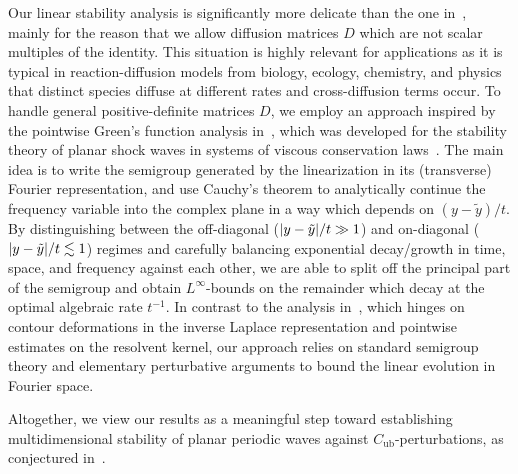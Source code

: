 \documentclass[12pt,oneside,a4paper,reqno]{amsart}
\numberwithin{equation}{section}
\theoremstyle{definition}
\theoremstyle{remark}
\newcommand{\Cub}{{C_{\mathrm{ub}}}}
\DeclarePairedDelimiter{\abs}{\lvert}{\rvert}
\begin{document}
Our linear stability analysis is significantly more delicate than the one in~\cite{kapitula_multidimensional_1997}, mainly for the reason that we allow diffusion matrices $D$ which are not scalar multiples of the identity.
This situation is highly relevant for applications as it is typical in reaction-diffusion models from biology, ecology, chemistry, and physics that distinct species diffuse at different rates and cross-diffusion terms occur. 
To handle general positive-definite matrices $D$, we employ an approach inspired by the pointwise Green's function analysis in~\cite{Hoff_pointwise_2002}, which was developed for the stability theory of planar shock waves in systems of viscous conservation laws~\cite{Hoff_asymptotic_2000}.
The main idea is to write the semigroup generated by the linearization in its (transverse) Fourier representation, and use Cauchy's theorem to analytically continue the frequency variable into the complex plane in a way which depends on $(y - \tilde{y}) / t$.
By distinguishing between the off-diagonal ($\abs{y - \tilde{y}} / t \gg 1$) and on-diagonal ($\abs{y - \tilde{y}} / t \lesssim 1$) regimes and carefully balancing exponential decay/growth in time, space, and frequency against each other, we are able to split off the principal part of the semigroup and obtain $L^{\infty}$-bounds on the remainder which decay at the optimal algebraic rate $t^{-1}$. In contrast to the analysis in~\cite{Hoff_pointwise_2002}, which hinges on contour deformations in the inverse Laplace representation and pointwise estimates on the resolvent kernel, our approach relies on standard semigroup theory and elementary perturbative arguments to bound the linear evolution in Fourier space. 

Altogether, we view our results as a meaningful step toward establishing multidimensional stability of planar periodic waves against $\Cub$-perturbations, as conjectured in~\cite[\S6.5]{derijk_nonlinear_2024}.
\end{document}
